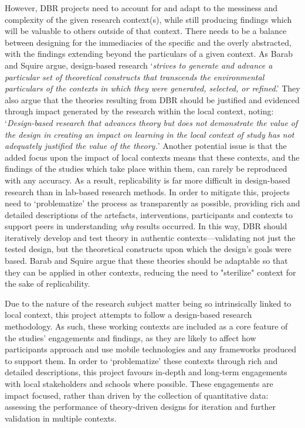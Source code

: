 However, DBR projects need to account for and adapt to the messiness and complexity of the given research context(s), while still producing findings which will be valuable to others outside of that context. There needs to be a balance between designing for the immediacies of the specific and the overly abstracted, with the findings extending beyond the particulars of a given context. As Barab and Squire argue, design-based research `\textit{strives to generate and advance a particular set of theoretical constructs that transcends the environmental particulars of the contexts in which they were generated, selected, or refined}.' They also argue that the theories resulting from DBR should be justified and evidenced through impact generated by the research within the local context, noting: `\textit{Design-based research that advances theory but does not demonstrate the value of the design in creating an impact on learning in the local context of study has not adequately justified the value of the theory.}' Another potential issue is that the added focus upon the impact of local contexts means that these contexts, and the findings of the studies which take place within them, can rarely be reproduced with any accuracy. As a result, replicability is far more difficult in design-based research than in lab-based research methods. In order to mitigate this, projects need to `problematize' the process as transparently as possible, providing rich and detailed descriptions of the artefacts, interventions, participants and contexts to support peers in understanding \textit{why} results occurred. In this way, DBR should iteratively develop and test theory in authentic contexts---validating not just the tested design, but the theoretical constructs upon which the design's goals were based. Barab and Squire argue that these theories should be adaptable so that they can be applied in other contexts, reducing the need to "sterilize" context for the sake of replicability.

Due to the nature of the research subject matter being so intrinsically linked to local context, this project attempts to follow a design-based research methodology. As such, these working contexts are included as a core feature of the studies' engagements and findings, as they are likely to affect how participants approach and use mobile technologies and any frameworks produced to support them. In order to `problematize' these contexts through rich and detailed descriptions, this project favours in-depth and long-term engagements with local stakeholders and schools where possible. These engagements are impact focused, rather than driven by the collection of quantitative data: assessing the performance of theory-driven designs for iteration and further validation in multiple contexts.

